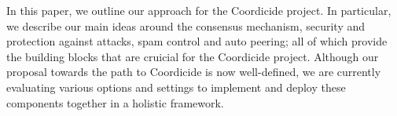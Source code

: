 \documentclass[../main.tex]{subfiles}
\begin{document}
In this paper, we outline our approach for the Coordicide project. In particular, we describe our main ideas around the consensus mechanism, security and protection against attacks, spam control and auto peering; all of which provide the building blocks that are cruicial for the Coordicide project. Although our proposal towards the path to Coordicide is now well-defined, we are currently evaluating various options and settings to implement and deploy these components together in a holistic framework. 

\begin{comment}
    

\begin{itemize}
    \item CLIRI is the most engineering-focused part of the Coordicide, and is centered on solving practical issues in converting the IRI codebase to a decentralized implementation.
    As CLIRI matures, it will serve as the platform for integrating all of the different Coordicide components together.
    
    \item By adding secured metadata to the communication layer it becomes possible to link transactions to their issuing node.
    Together with global node IDs as well as the proposed token-based Sybil protection, this offers a secure foundation for the other approaches described in the paper.
    
    \item We propose a hybrid rate control algorithm achieving a reasonable compromise: slow nodes or users with low \textit{mana} can issue (a few) transactions at inexpensive prices, while at the same time faster users cannot spam the network due to a limitation on burst of transactions.

    \item We propose a secure and robust auto peering protocol, which uses the concept of private and public salt to allow network reorganization and protect the network against Eclipse attacks.
    
    \item The tip selection strategy has been a crucial component since the inception of IOTA.
    It continues to be of great importance when making the network more resilient against attacks and improving conflict resolution.
    
    \item Finally, we propose two approaches to extend the previous consensus layer.
    By retrieving opinions about conflicts from others directly, nodes get enabled to resolve conflicts pro-actively.
\end{itemize}

\end{comment}
\end{document}
